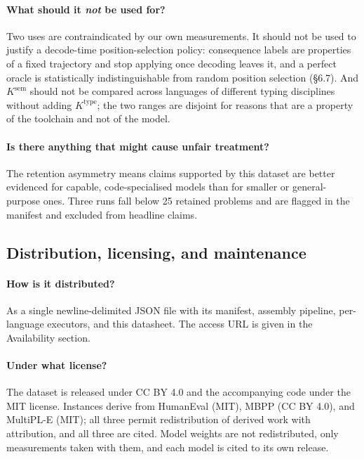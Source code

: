 \paragraph{What should it \emph{not} be used for?} Two uses are contraindicated by our own
measurements. It should not be used to justify a decode-time position-selection policy: consequence
labels are properties of a fixed trajectory and stop applying once decoding leaves it, and a perfect
oracle is statistically indistinguishable from random position selection
(\S6.7). And $K^{\mathrm{sem}}$ should not be compared across languages of different
typing disciplines without adding $K^{\mathrm{type}}$; the two ranges are disjoint for reasons that
are a property of the toolchain and not of the model.

\paragraph{Is there anything that might cause unfair treatment?} The retention asymmetry means claims
supported by this dataset are better evidenced for capable, code-specialised models than for smaller
or general-purpose ones. Three runs fall below 25 retained problems and are flagged in the manifest
and excluded from headline claims.

\subsection*{Distribution, licensing, and maintenance}
\label{app:licensing}

\paragraph{How is it distributed?} As a single newline-delimited JSON file with its manifest,
assembly pipeline, per-language executors, and this datasheet. The access URL is given in the
Availability section.

\paragraph{Under what license?} The dataset is released under CC BY 4.0 and the accompanying code
under the MIT license. Instances derive from HumanEval (MIT), MBPP (CC BY 4.0), and MultiPL-E
(MIT); all three permit redistribution of derived work with attribution, and all three are cited.
Model weights are not redistributed, only measurements taken with them, and each model is cited to
its own release.

